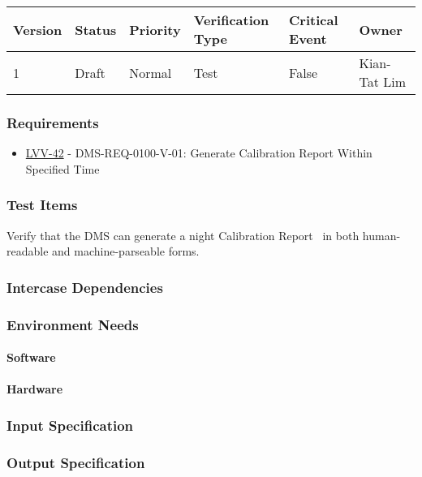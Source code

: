 \begin{longtable}[]{llllll}
\toprule
Version & Status & Priority & Verification Type & Critical Event & Owner
\\\midrule
1 & Draft & Normal &
Test & False & Kian-Tat Lim
\\\bottomrule
\end{longtable}

\subsubsection{Requirements}
\begin{itemize}
\item \href{https://jira.lsstcorp.org/browse/LVV-42}{LVV-42} - DMS-REQ-0100-V-01: Generate Calibration Report Within Specified Time
\end{itemize}

\subsubsection{Test Items}
Verify that the DMS can generate a night Calibration Report ~in both
human-readable and machine-parseable forms.



\subsubsection{Intercase Dependencies}

\subsubsection{Environment Needs}

\paragraph{Software}

\paragraph{Hardware}

\subsubsection{Input Specification}

\subsubsection{Output Specification}

